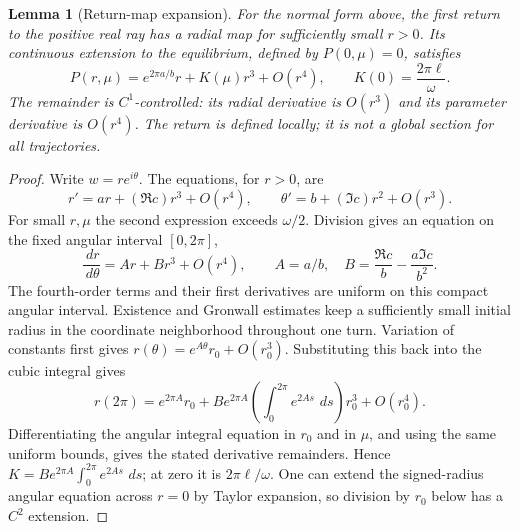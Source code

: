 \documentclass[11pt,oneside]{book}
\newtheorem{lemma}[theorem]{Lemma}
\theoremstyle{definition}
\theoremstyle{remark}\newtheorem{remark}[theorem]{Remark}
\newcommand{\dd}{\,d}\newcommand{\id}{\operatorname{id}}
\begin{document}
\begin{lemma}[Return-map expansion]\label{d13:16:hopf-return-expansion}
For the normal form above, the first return to the positive real ray
has a radial map for sufficiently small \(r>0\). Its continuous
extension to the equilibrium, defined by \(P(0,\mu)=0\), satisfies
\[
 P(r,\mu)=e^{2\pi a/b}r+K(\mu)r^3+O(r^4),\qquad
 K(0)=\frac{2\pi\ell}{\omega}.
\]
The remainder is \(C^1\)-controlled: its radial derivative is \(O(r^3)\)
and its parameter derivative is \(O(r^4)\). The return is defined
locally; it is not a global section for all trajectories.
\end{lemma}
\begin{proof}
Write \(w=re^{i\theta}\). The equations, for \(r>0\), are
\[
 r'=ar+(\Re c)r^3+O(r^4),\qquad
 \theta'=b+(\Im c)r^2+O(r^3).
\]
For small \(r,\mu\) the second expression exceeds \(\omega/2\).
Division gives an equation on the fixed angular interval \([0,2\pi]\),
\[
 \frac{\dd r}{\dd\theta}
 =Ar+Br^3+O(r^4),\qquad
 A=a/b,\quad B=\frac{\Re c}{b}-\frac{a\Im c}{b^2}.
\]
The fourth-order terms and their first derivatives are uniform on
this compact angular interval. Existence and Gronwall estimates keep
a sufficiently small initial radius in the coordinate neighborhood
throughout one turn. Variation of constants first gives
\(r(\theta)=e^{A\theta}r_0+O(r_0^3)\). Substituting this back into the
cubic integral gives
\[
 r(2\pi)=e^{2\pi A}r_0+
 B e^{2\pi A}\left(\int_0^{2\pi}e^{2As}\,\dd s\right)r_0^3
 +O(r_0^4).
\]
Differentiating the angular integral equation in \(r_0\) and in \(\mu\),
and using the same uniform bounds, gives the stated derivative
remainders. Hence \(K=B e^{2\pi A}\int_0^{2\pi}e^{2As}\,\dd s\);
at zero it is \(2\pi\ell/\omega\).
One can extend the signed-radius angular equation across \(r=0\)
by Taylor expansion, so division by \(r_0\) below has a \(C^2\) extension.
\end{proof}
\end{document}
